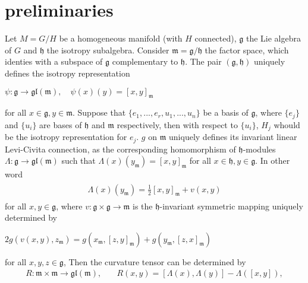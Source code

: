 \documentclass[11pt,oneside,leqno]{amsart}
\theoremstyle{plain}
\begin{document}
\section{preliminaries}
Let $M = G/H$ be a homogeneous manifold (with $H$ connected), ${{\mathfrak{g}}}$ the Lie algebra
 of $G$ and ${{\mathfrak{h}}}$ the isotropy subalgebra. Consider ${{\mathfrak{m}}} ={{\mathfrak{g}}} /{{\mathfrak{h}}}$ the factor space, which identies
with a subspace of ${{\mathfrak{g}}}$ complementary to ${{\mathfrak{h}}}$. The pair $({{\mathfrak{g}}},{{\mathfrak{h}}})$ uniquely defines the isotropy
representation
\begin{center}
$\psi :{{\mathfrak{g}}} \longrightarrow \mathfrak{gl}({{\mathfrak{m}}}),\quad      \psi(x)(y)=[x,y]_{{\mathfrak{m}}}$   
\end{center}
for all  $x\in {{\mathfrak{g}}}, y\in {{\mathfrak{m}}}$. Suppose that $\lbrace e_1,...,e_r,u_1,...,u_n\rbrace$ be a basis of ${{\mathfrak{g}}}$, where $\lbrace e_j\rbrace$ and $\lbrace u_i\rbrace$ are bases of ${{\mathfrak{h}}}$ and ${{\mathfrak{m}}}$
respectively, then with respect to $\lbrace u_i \rbrace$, $H_j$ whould be the isotropy representation  for $e_j$.
$g$ on ${{\mathfrak{m}}}$ uniquely defines its invariant linear Levi-Civita connection, as the corresponding homomorphism of ${{\mathfrak{h}}}$-modules  $\Lambda:{{\mathfrak{g}}} \longrightarrow \mathfrak{gl}({{\mathfrak{m}}})$ such that $\Lambda(x)(y_{{\mathfrak{m}}})=[x,y]_{{\mathfrak{m}}}$ for all  $x\in {{\mathfrak{h}}}, y\in {{\mathfrak{g}}}$. In other word
\begin{eqnarray}\label{con}
\begin{array}{cccc}
\Lambda(x)(y_{{\mathfrak{m}}})=\frac{1}{2}[x,y]_{{\mathfrak{m}}}+v(x,y)
\end{array}
\end{eqnarray}
for all  $x,y\in {{\mathfrak{g}}}$, where $v:{{\mathfrak{g}}} \times {{\mathfrak{g}}}\rightarrow {{\mathfrak{m}}}$ is the ${{\mathfrak{h}}}$-invariant symmetric mapping uniquely determined by
\begin{center}
$2g(v(x, y), z_{{\mathfrak{m}}}) = g(x_{{\mathfrak{m}}}, [z,y]_{{\mathfrak{m}}}) + g(y_{{\mathfrak{m}}},[z,x]_{{\mathfrak{m}}})$
\end{center}
for all  $x,y,z\in {{\mathfrak{g}}}$,
Then the curvature tensor can be determined by
\begin{eqnarray}\label{cur}
R:{{\mathfrak{m}}} \times {{\mathfrak{m}}} \longrightarrow \mathfrak{gl}({{\mathfrak{m}}}),\quad & R(x,y)=[\Lambda(x),\Lambda(y)]-\Lambda ([x,y]),   
\end{eqnarray}
\end{document}
